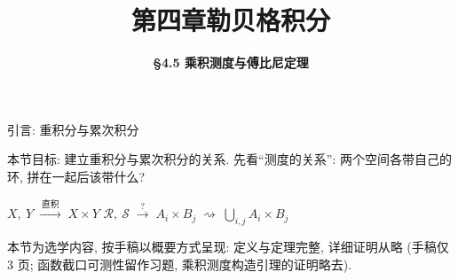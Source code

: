 


\title[第四章\\
勒贝格积分]{\texorpdfstring{\LARGE \bfseries 第四章\quad 勒贝格积分}{第四章 勒贝格积分}} %
\author[\S 4.5\\
乘积测度与傅比尼] %
{\Large \bfseries \S 4.5 乘积测度与傅比尼定理}
\date{}





\begin{frame}

\titlepage

\end{frame}




\begin{frame}{引言: 重积分与累次积分}

本节目标: 建立\alert{重积分}与\alert{累次积分}的关系. 先看``测度的关系'':
两个空间各带自己的环, 拼在一起后该带什么?

\begin{center}
$X,\ Y \;\xrightarrow{\ \text{直积}\ }\; X \times Y$
\qquad\qquad
$\mathscr{R},\ \mathscr{S} \;\xrightarrow{\;?\;}\;
A_i \times B_j \;\rightsquigarrow\; \bigcup_{i,j} A_i \times B_j$
\end{center}

\pause

\begin{attnblock}[选学说明]
本节为\alert{选学内容}, 按手稿以概要方式呈现: 定义与定理完整,
详细证明从略 (手稿仅 3 页; 函数截口可测性留作习题, 乘积测度构造引理的证明略去).
\end{attnblock}

\end{frame}


